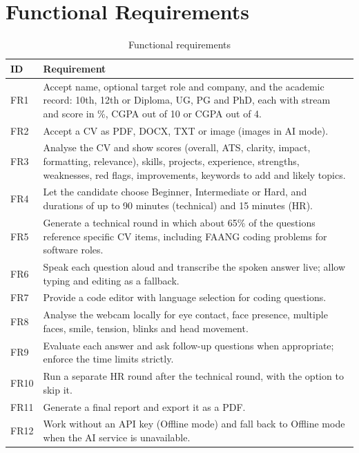 \documentclass[12pt,a4paper,oneside]{report}
\begin{document}
\section{Functional Requirements}
\begin{table}[H]
\centering
\caption{Functional requirements}
\label{tab:fr}
\small
\begin{tabularx}{\textwidth}{@{}lY@{}}
\toprule
\textbf{ID} & \textbf{Requirement} \\
\midrule
FR1 & Accept name, optional target role and company, and the academic record: 10th, 12th or Diploma, UG, PG and PhD, each with stream and score in \%, CGPA out of 10 or CGPA out of 4. \\
FR2 & Accept a CV as PDF, DOCX, TXT or image (images in AI mode). \\
FR3 & Analyse the CV and show scores (overall, ATS, clarity, impact, formatting, relevance), skills, projects, experience, strengths, weaknesses, red flags, improvements, keywords to add and likely topics. \\
FR4 & Let the candidate choose Beginner, Intermediate or Hard, and durations of up to 90 minutes (technical) and 15 minutes (HR). \\
FR5 & Generate a technical round in which about 65\% of the questions reference specific CV items, including FAANG coding problems for software roles. \\
FR6 & Speak each question aloud and transcribe the spoken answer live; allow typing and editing as a fallback. \\
FR7 & Provide a code editor with language selection for coding questions. \\
FR8 & Analyse the webcam locally for eye contact, face presence, multiple faces, smile, tension, blinks and head movement. \\
FR9 & Evaluate each answer and ask follow-up questions when appropriate; enforce the time limits strictly. \\
FR10 & Run a separate HR round after the technical round, with the option to skip it. \\
FR11 & Generate a final report and export it as a PDF. \\
FR12 & Work without an API key (Offline mode) and fall back to Offline mode when the AI service is unavailable. \\
\bottomrule
\end{tabularx}
\end{table}
\end{document}
